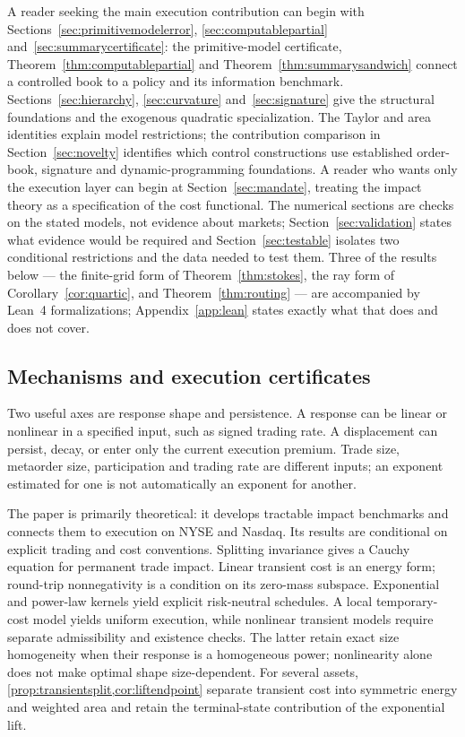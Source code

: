 \documentclass[11pt]{article}
\numberwithin{equation}{section}
\theoremstyle{definition}
\theoremstyle{remark}
\theoremstyle{definition}
\begin{document}
A reader seeking the main execution contribution can begin with
Sections~\ref{sec:primitivemodelerror}, \ref{sec:computablepartial}
and~\ref{sec:summarycertificate}: the primitive-model certificate,
Theorem~\ref{thm:computablepartial} and Theorem~\ref{thm:summarysandwich}
connect a controlled book to a policy and its information benchmark.
Sections~\ref{sec:hierarchy}, \ref{sec:curvature} and~\ref{sec:signature}
give the structural foundations and the exogenous quadratic specialization.
The Taylor and area identities explain model restrictions; the contribution
comparison in Section~\ref{sec:novelty} identifies which control constructions
use established order-book, signature and dynamic-programming foundations. A reader who wants only the execution layer
can begin at Section~\ref{sec:mandate}, treating the impact theory as a
specification of the cost functional. The numerical sections are checks on the
stated models, not evidence about markets; Section~\ref{sec:validation} states
what evidence would be required and Section~\ref{sec:testable} isolates two
conditional restrictions and the data needed to test them.
Three of the results below --- the finite-grid form of
Theorem~\ref{thm:stokes}, the ray form of Corollary~\ref{cor:quartic}, and
Theorem~\ref{thm:routing} --- are accompanied by Lean~4 formalizations;
Appendix~\ref{app:lean} states exactly what that does and does not cover.

\subsection{Mechanisms and execution certificates}

Two useful axes are response shape and persistence. A response can be linear or
nonlinear in a specified input, such as signed trading rate. A displacement can
persist, decay, or enter only the current execution premium. Trade size,
metaorder size, participation and trading rate are different inputs; an exponent
estimated for one is not automatically an exponent for another.

The paper is primarily theoretical: it develops tractable impact benchmarks and
connects them to execution on NYSE and Nasdaq. Its results are conditional on explicit trading and cost
conventions. Splitting invariance gives a Cauchy equation for permanent trade
impact. Linear transient cost is an energy form; round-trip nonnegativity is a
condition on its zero-mass subspace. Exponential and power-law kernels yield
explicit risk-neutral schedules. A local temporary-cost model yields uniform
execution, while nonlinear transient models require separate admissibility and
existence checks. The latter retain exact size homogeneity when their response is
a homogeneous power; nonlinearity alone does not make optimal shape size-dependent.
For several assets, \cref{prop:transientsplit,cor:liftendpoint} separate
transient cost into symmetric energy and weighted area and retain the
terminal-state contribution of the exponential lift.
\end{document}
